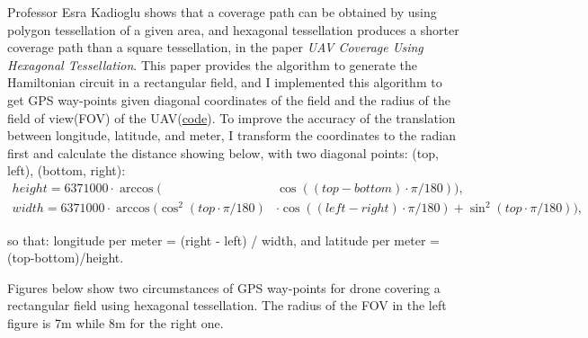 \documentclass{article}
\begin{document}
\hspace{\parindent} Professor Esra Kadioglu shows that a coverage path can be obtained by using polygon tessellation of a given area, and hexagonal tessellation produces a shorter coverage path than a square tessellation, in the paper \textit{UAV Coverage Using Hexagonal Tessellation}\cite{esra}. This paper provides the algorithm to generate the Hamiltonian circuit in a rectangular field, and I implemented this algorithm to get GPS way-points given diagonal coordinates of the field and the radius of the field of view(FOV) of the UAV(\href{https://github.com/zcczhang/UAV_Coverage/tree/master/Get_Path}{code}). To improve the accuracy of the translation between longitude, latitude, and meter, I transform the coordinates to the radian first and calculate the distance showing below, with two diagonal points: (top, left), (bottom, right):
\begin{subequations}
    \begin{align}
         height = 6371000 \cdot \arccos(&\cos((top-bottom)\cdot\pi/180)),   \\
         width = 6371000 \cdot \arccos(\cos^{2}(top \cdot \pi/180) &\cdot \cos((left-right)\cdot \pi/180) + \sin^{2}(top \cdot \pi/180)), 
    \end{align}
\end{subequations}

\noindent so that: longitude per meter = (right - left) / width, and latitude per meter = (top-bottom)/height.

Figures below show two circumstances of GPS way-points for drone covering a rectangular field using hexagonal tessellation. The radius of the FOV in the left figure is 7m while 8m for the right one. 
\end{document}
